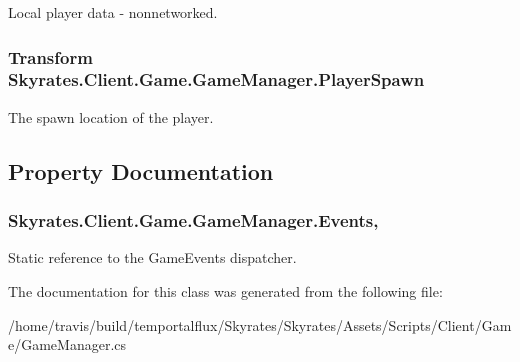 Local player data -\/ nonnetworked. 

\hypertarget{class_skyrates_1_1_client_1_1_game_1_1_game_manager_ade8d1e4254dfb7141f1365a5751ef987}{
\subsubsection[{Player\-Spawn}]{\setlength{\rightskip}{0pt plus 5cm}Transform Skyrates.\-Client.\-Game.\-Game\-Manager.\-Player\-Spawn}}\label{class_skyrates_1_1_client_1_1_game_1_1_game_manager_ade8d1e4254dfb7141f1365a5751ef987}


The spawn location of the player. 



\subsection{Property Documentation}
\hypertarget{class_skyrates_1_1_client_1_1_game_1_1_game_manager_a0fe4743cbadedfc0ad93d51534f3d339}{
\subsubsection[{Events}]{ Skyrates.\-Client.\-Game.\-Game\-Manager.\-Events\hspace{0.3cm}{\ttfamily [static]}, {\ttfamily [get]}}}\label{class_skyrates_1_1_client_1_1_game_1_1_game_manager_a0fe4743cbadedfc0ad93d51534f3d339}


Static reference to the Game\-Events dispatcher. 



The documentation for this class was generated from the following file\-:\begin{DoxyCompactItemize}
\item 
/home/travis/build/temportalflux/\-Skyrates/\-Skyrates/\-Assets/\-Scripts/\-Client/\-Game/Game\-Manager.\-cs\end{DoxyCompactItemize}
